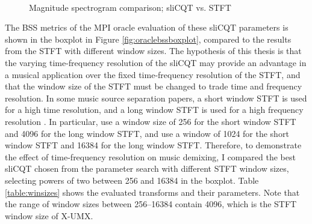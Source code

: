 \documentclass[report.tex]{subfiles}
\begin{document}
\begin{figure}[ht]
	\centering
	\\
	\caption{Magnitude spectrogram comparison; sliCQT vs. STFT}
	\label{fig:bipolarslicqs}
\end{figure}

The BSS metrics of the MPI oracle evaluation of these sliCQT parameters is shown in the boxplot in Figure \ref{fig:oraclebssboxplot}, compared to the results from the STFT with different window sizes. The hypothesis of this thesis is that the varying time-frequency resolution of the sliCQT may provide an advantage in a musical application over the fixed time-frequency resolution of the STFT, and that the window size of the STFT must be changed to trade time and frequency resolution. In some music source separation papers, a short window STFT is used for a high time resolution, and a long window STFT is used for a high frequency resolution \parencite{fitzgerald2, driedger}. In particular, \textcite{driedger} use a window size of 256 for the short window STFT and 4096 for the long window STFT, and \textcite{fitzgerald2} use a window of 1024 for the short window STFT and 16384 for the long window STFT. Therefore, to demonstrate the effect of time-frequency resolution on music demixing, I compared the best sliCQT chosen from the parameter search with different STFT window sizes, selecting powers of two between 256 and 16384 in the boxplot. Table \ref{table:winsizes} shows the evaluated transforms and their parameters. Note that the range of window sizes between 256--16384 contain 4096, which is the STFT window size of X-UMX.
\end{document}
